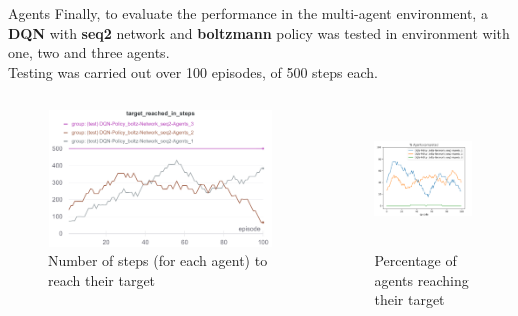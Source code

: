 \documentclass[10pt, xcolor={dvipsnames}]{beamer}
\begin{document}
{
\begin{frame}{Agents}
    Finally, to evaluate the performance in the multi-agent environment, a \textbf{DQN} with \textbf{seq2} network and \textbf{boltzmann} policy was tested in environment with \alert{one}, \alert{two} and \alert{three agents}.\\
    Testing was carried out over 100 episodes, of 500 steps each.
    
    \begin{columns}
    \begin{figure}
        \centering
        \includegraphics[width=1\textwidth, height=0.75\textwidth]{assets/results/agents/target_reached_in_steps.png}
        \caption*{Number of steps (for each agent) to reach their target}
    \end{figure}
    \vspace{-0.45cm}
    \begin{figure}
        \centering
        \includegraphics[width=1\textwidth, height=0.75\textwidth]{assets/results/agents/perc_agents_completed.png}
        \caption*{Percentage of agents reaching their target}
    \end{figure}
    \end{columns}
\end{frame}
}
\end{document}
